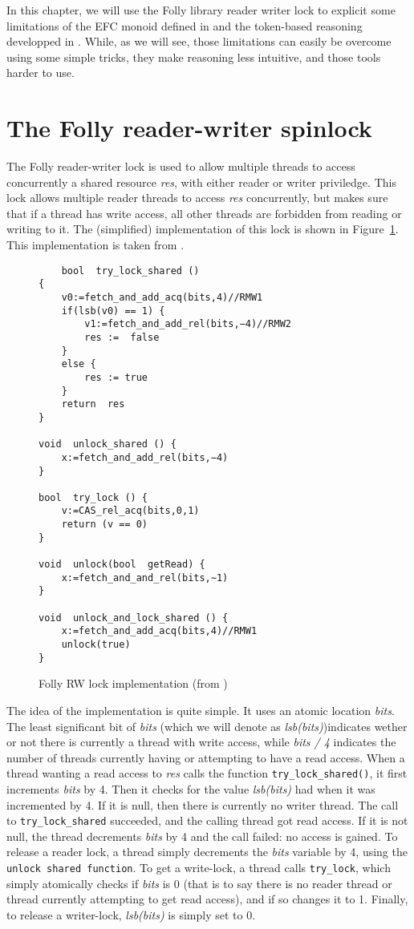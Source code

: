 \label{sec1}
In this chapter, we will use the Folly library reader writer lock \cite{follyRW} to explicit some limitations of the EFC monoid defined in \cite{gaurav} and the token-based reasoning developped in \cite{pascal}. While, as we will see, those limitations can easily be overcome using some simple tricks, they make reasoning less intuitive, and those tools harder to use.

\section{The Folly reader-writer spinlock}
The Folly reader-writer lock is used to allow multiple threads to access concurrently a shared resource \emph{res}, with either reader or writer priviledge. This lock allows multiple reader threads to access \emph{res} concurrently, but makes sure that if a thread has write access, all other threads are forbidden from reading or writing to it. The (simplified) implementation of this lock is shown in Figure~\ref{fig:follyRWL}. This implementation is taken from \cite{gaurav}.

\begin{figure}
	\begin{lstlisting}
	bool  try_lock_shared ()
{
	v0:=fetch_and_add_acq(bits,4)//RMW1
	if(lsb(v0) == 1) {
		v1:=fetch_and_add_rel(bits,−4)//RMW2
		res :=  false
	}
	else {
		res := true
	}
	return  res
}

void  unlock_shared () {
	x:=fetch_and_add_rel(bits,−4)
}

bool  try_lock () {
	v:=CAS_rel_acq(bits,0,1)
	return (v == 0)
}

void  unlock(bool  getRead) {
	x:=fetch_and_and_rel(bits,∼1)
}

void  unlock_and_lock_shared () {
	x:=fetch_and_add_acq(bits,4)//RMW1
	unlock(true)
}
	\end{lstlisting}
\caption{Folly RW lock implementation (from \cite{gaurav})}
		\label{fig:follyRWL}
\end{figure}

The idea of the implementation is quite simple. It uses an atomic location \emph{bits}. The least significant bit of \emph{bits} (which we will denote as \emph{lsb(bits)})indicates wether or not there is currently a thread with write access, while \emph{bits / 4} indicates the number of threads currently having or attempting to have a read access. When a thread wanting a read access to \emph{res} calls the function \texttt{try\_lock\_shared()}, it first increments \emph{bits} by 4. Then it checks for the value \emph{lsb(bits)} had when it was incremented by 4. If it is null, then there is currently no writer thread. The call to \texttt{try\_lock\_shared} succeeded, and the calling thread got read access. If it is not null, the thread decrements \emph{bits} by 4 and the call failed: no access is gained. To release a reader lock, a thread simply decrements the \emph{bits} variable by 4, using the \texttt{unlock shared function}. To get a write-lock, a thread calls \texttt{try\_lock}, which simply atomically checks if \emph{bits} is 0 (that is to say there is no reader thread or thread currently attempting to get read access), and if so changes it to 1. Finally, to release a writer-lock, \emph{lsb(bits)} is simply set to 0.

